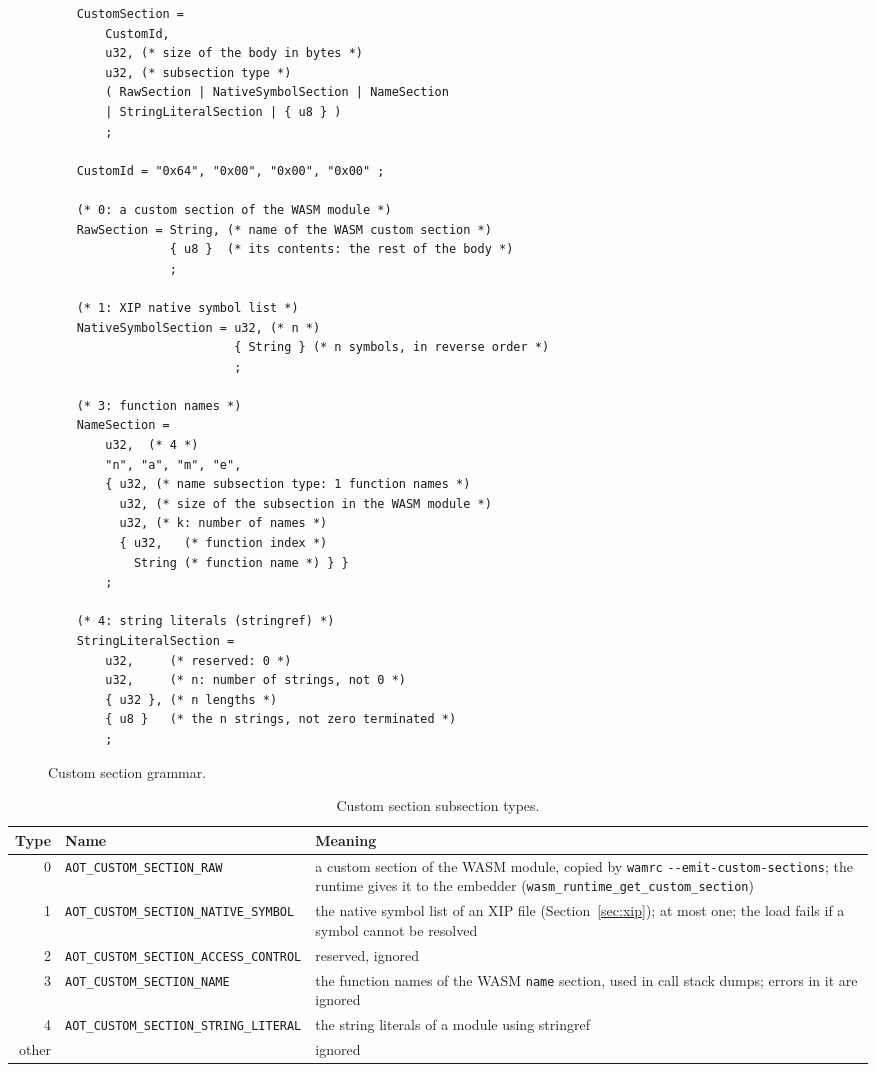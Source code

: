 \documentclass{article}
\begin{document}
\begin{figure}[H]
\begin{verbatim}
    CustomSection =
        CustomId,
        u32, (* size of the body in bytes *)
        u32, (* subsection type *)
        ( RawSection | NativeSymbolSection | NameSection
        | StringLiteralSection | { u8 } )
        ;

    CustomId = "0x64", "0x00", "0x00", "0x00" ;

    (* 0: a custom section of the WASM module *)
    RawSection = String, (* name of the WASM custom section *)
                 { u8 }  (* its contents: the rest of the body *)
                 ;

    (* 1: XIP native symbol list *)
    NativeSymbolSection = u32, (* n *)
                          { String } (* n symbols, in reverse order *)
                          ;

    (* 3: function names *)
    NameSection =
        u32,  (* 4 *)
        "n", "a", "m", "e",
        { u32, (* name subsection type: 1 function names *)
          u32, (* size of the subsection in the WASM module *)
          u32, (* k: number of names *)
          { u32,   (* function index *)
            String (* function name *) } }
        ;

    (* 4: string literals (stringref) *)
    StringLiteralSection =
        u32,     (* reserved: 0 *)
        u32,     (* n: number of strings, not 0 *)
        { u32 }, (* n lengths *)
        { u8 }   (* the n strings, not zero terminated *)
        ;
\end{verbatim}
\caption{Custom section grammar.}
\label{fig:custom-section-grammar}
\end{figure}

\begin{table}[H]
\centering
\begin{tabular}{rlp{8cm}}
    \hline
    Type & Name & Meaning \\
    \hline
    0 & \verb|AOT_CUSTOM_SECTION_RAW| & a custom section of the WASM module, copied by \texttt{wamrc} \verb|--emit-custom-sections|; the runtime gives it to the embedder (\verb|wasm_runtime_get_custom_section|) \\
    1 & \verb|AOT_CUSTOM_SECTION_NATIVE_SYMBOL| & the native symbol list of an XIP file (Section~\ref{sec:xip}); at most one; the load fails if a symbol cannot be resolved \\
    2 & \verb|AOT_CUSTOM_SECTION_ACCESS_CONTROL| & reserved, ignored \\
    3 & \verb|AOT_CUSTOM_SECTION_NAME| & the function names of the WASM \verb|name| section, used in call stack dumps; errors in it are ignored \\
    4 & \verb|AOT_CUSTOM_SECTION_STRING_LITERAL| & the string literals of a module using stringref \\
    other & & ignored \\
    \hline
\end{tabular}
\caption{Custom section subsection types.}
\label{table:custom-types}
\end{table}
\end{document}
